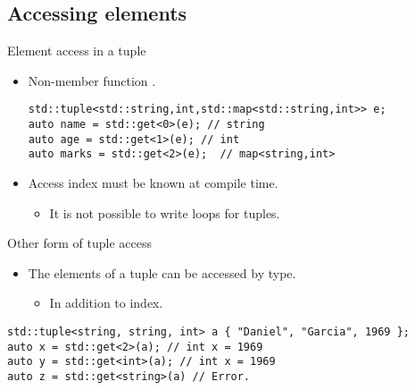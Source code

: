 \subsection{Accessing elements}

\begin{frame}[t,fragile]{Element access in a tuple}
  \begin{itemize}
    \item Non-member function .
\begin{lstlisting}
std::tuple<std::string,int,std::map<std::string,int>> e;
auto name = std::get<0>(e); // string
auto age = std::get<1>(e); // int
auto marks = std::get<2>(e);  // map<string,int>
\end{lstlisting}

    \item Access index must be known at compile time.
      \begin{itemize}
        \item It is not possible to write loops for tuples.
      \end{itemize}
  \end{itemize}
\end{frame}

\begin{frame}[t,fragile]{Other form of tuple access}
\begin{itemize}
  \item The elements of a tuple can be accessed by type.
    \begin{itemize}
      \item In addition to index.
    \end{itemize}
\end{itemize}
\begin{lstlisting}
std::tuple<string, string, int> a { "Daniel", "Garcia", 1969 };
auto x = std::get<2>(a); // int x = 1969
auto y = std::get<int>(a); // int x = 1969
auto z = std::get<string>(a) // Error.
\end{lstlisting}
\end{frame}


